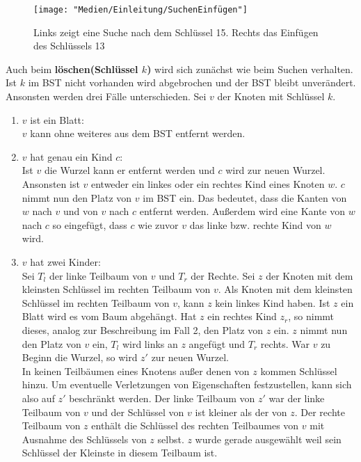 \documentclass[a4paper,12pt]{article}
\begin{document}
\begin{figure}[h]
	\centering
	\texttt{[image: "Medien/Einleitung/SuchenEinfügen"]}
	\caption{Links zeigt eine Suche nach dem Schlüssel 15. Rechts das Einfügen des Schlüssels 13}
	\label{fig:SuchenEinfügen}
\end{figure}
\noindent Auch beim \textbf{löschen(Schlüssel $k$)} wird sich zunächst wie beim Suchen verhalten. Ist $k$ im BST nicht vorhanden wird abgebrochen und der BST bleibt unverändert. Ansonsten werden drei Fälle unterschieden.
Sei $v$ der Knoten mit Schlüssel $k$.
\begin{enumerate}
	\item $v$ ist ein Blatt: \\
	$v$ kann ohne weiteres aus dem BST entfernt werden.
	\item $v$ hat genau ein Kind $c$:\\
     Ist $v$ die Wurzel kann er entfernt werden und $c$ wird zur neuen Wurzel. Ansonsten ist $v$ entweder ein linkes oder ein rechtes Kind eines Knoten $w$. $c$ nimmt nun den Platz von $v$ im BST ein. Das bedeutet, dass die Kanten von $w$ nach $v$ und von $v$ nach $c$ entfernt werden. Außerdem wird eine Kante von $w$ nach $c$ so eingefügt, dass $c$ wie zuvor $v$ das linke bzw. rechte Kind von $w$ wird. 
	\item $v$ hat zwei Kinder:\\
	Sei $T_l$ der linke Teilbaum von $v$ und $T_r$ der Rechte.
	Sei $z$ der Knoten mit dem kleinsten Schlüssel im rechten Teilbaum von $v$. Als Knoten mit dem kleinsten Schlüssel im rechten Teilbaum von $v$, kann $z$ kein linkes Kind haben. Ist $z$ ein Blatt wird es vom Baum abgehängt. Hat $z$ ein rechtes Kind $z_r$, so nimmt dieses, analog zur Beschreibung im Fall 2, den Platz von $z$ ein. $z$ nimmt nun den Platz von $v$ ein, $T_l$ wird links an $z$ angefügt und $T_r$ rechts. War $v$ zu Beginn die Wurzel, so wird $z'$ zur neuen Wurzel.\\
	In keinen Teilbäumen eines Knotens außer denen von $z$ kommen Schlüssel hinzu. Um eventuelle Verletzungen von Eigenschaften festzustellen, kann sich also auf $z'$ beschränkt werden. Der linke Teilbaum von $z'$ war der linke Teilbaum von $v$ und der Schlüssel von $v$ ist kleiner als der von $z$. Der rechte Teilbaum von $z$ enthält die Schlüssel des rechten Teilbaumes von $v$ mit Ausnahme des Schlüssels von $z$ selbst. $z$ wurde gerade ausgewählt weil sein Schlüssel der Kleinste in diesem Teilbaum ist. 
	
	
	
	 
\end{enumerate} 
\end{document}
